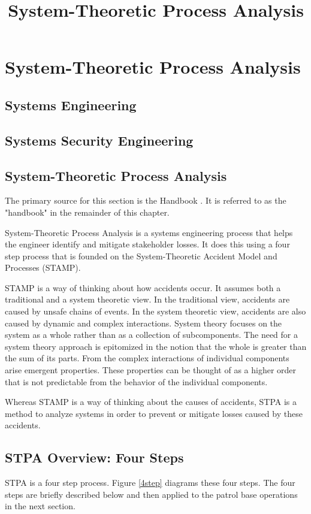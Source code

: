 \documentclass[../../main/main.tex]{subfiles}
\begin{document}
\title{System-Theoretic Process Analysis}


\chapter{System-Theoretic Process Analysis}
\section{Systems Engineering}
\section{Systems Security Engineering}
\section{System-Theoretic Process Analysis} The primary source for this section is the  Handbook \cite{stpa}. It is referred to as the "handbook" in the remainder of this chapter.

System-Theoretic Process Analysis is a systems engineering process that helps the engineer identify and mitigate stakeholder losses. It does this using a four step process that is founded on the System-Theoretic Accident Model and Processes (STAMP).  

STAMP is a way of thinking about how accidents occur.  It assumes both a traditional and a system theoretic view.  In the traditional view, accidents are caused by unsafe chains of events.  In the system theoretic view, accidents are also caused by dynamic and complex interactions. System theory focuses on the system as a whole rather than as a collection of subcomponents.  The need for a system theory approach is epitomized in the notion that the whole is greater than the sum of its parts.  From the complex interactions of individual components arise emergent properties. These properties can be thought of as a higher order that is not predictable from the behavior of the individual components.

Whereas STAMP is a way of thinking about the causes of accidents, STPA is a method to analyze systems in order to prevent or mitigate losses caused by these accidents.  

\section{STPA Overview: Four Steps}
STPA is a four step process.  Figure \ref{4step} diagrams these four steps.  The four steps are briefly described below and then applied to the patrol base operations in the next section.
\end{document}
